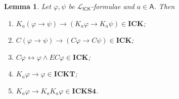\documentclass{myifcolog}
\newcommand\C {C}
\newcommand{\K}{K}
\newcommand\A{\mathsf{A}}
\newcommand{\agi}{a}
\newcommand{\E}{E}
\newcommand{\ICK}{\mathsf{ICK}}
\newcommand{\LICK}{\mathcal{L}_{\ICK}}
\newtheorem{lemma}[theorem]{Lemma}
\numberwithin{theorem}{section}
\begin{document}
\begin{lemma}\label{l: valid formulae}
    Let $\varphi, \psi$ be $\LICK$-formulae and $\agi \in \A$. Then
    \begin{enumerate}
        \item $\K_\agi (\varphi \rightarrow \psi) \rightarrow (\K_\agi \varphi \rightarrow \K_\agi \psi) \in \mathbf{ICK}$;
        \item $\C (\varphi \rightarrow \psi) \rightarrow (\C \varphi \rightarrow \C \psi) \in \mathbf{ICK}$;
        \item $\C \varphi \leftrightarrow \varphi \wedge \E \C \varphi \in \mathbf{ICK}$;
        \item $\K_\agi \varphi \rightarrow \varphi \in \mathbf{ICKT}$;
        \item $\K_\agi \varphi \rightarrow \K_\agi \K_\agi \varphi \in \mathbf{ICKS4}$.
    \end{enumerate}
\end{lemma}
\end{document}
